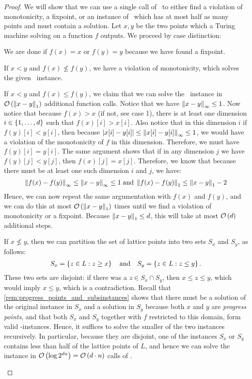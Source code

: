 \begin{proof}
	We will show that we can use a single call of \Tarskistar\ to either find a violation of monotonicity, a fixpoint, or an instance of \Tarski\, which has at most half as many points and must contain a solution. Let $x, y$ be the two points which a Turing machine solving \Tarskistar on a function $f$ outputs. We proceed by case distinction:
	\begin{case}{1}
		We are done if $f(x) = x$ or $f(y) = y$ because we have found a fixpoint.
	\end{case}
	\begin{case}{2.1}
		If $x < y$ and $f(x) \not\leq f(y)$, we have a violation of monotonicity, which solves the given \Tarski\ instance.
	\end{case}
	\begin{case}{2.2}
		If $x < y$ and $f(x) \leq f(y)$, we claim that we can solve the \Tarski\ instance in $\mathcal{O}\left(\left\lVert x - y\right\rVert_{1}\right)$ additional function calls. Notice that we have $\left\lVert x-y\right\rVert_{\infty} \leq 1$. Now notice that because $f(x) > x$ (if not, see case 1), there is at least one dimension $i \in \left\{1, \dots, d\right\}$ such that $f(x)[i] > x[i]$. Also notice that in this dimension $i$ if $f(y)[i] < y[i]$, then because $\left\lvert x[i] - y[i]\right\rvert \leq \left\lVert x[i] - y[i]\right\rVert_{\infty} \leq 1$, we would have a violation of the monotonicity of $f$ in this dimension. Therefore, we must have $f(y)[i] = y[i]$. The same argument shows that if in any dimension $j$ we have $f(y)[j] < y[j]$, then $f(x)[j] = x[j]$. Therefore, we know that because there must be at least one such dimension $i$ and $j$, we have:
		\begin{align*}
			\left\lVert f(x) - f(y)\right\rVert_{\infty} \leq \left\lVert x - y\right\rVert_{\infty} \leq 1 \; \text{and} \; \left\lVert f(x) - f(y)\right\rVert_{1} \leq \left\lVert x - y\right\rVert_{1} - 2
		\end{align*}
		Hence, we can now repeat the same argumentation with $f(x)$ and $f(y)$, and we can do this at most $\mathcal{O}\left(\left\lVert x - y\right\rVert_{1}\right)$ times until we find a violation of monotonicity or a fixpoint. Because $\left\lVert x - y\right\rVert_{1} \leq d$, this will take at most $\mathcal{O}\left(d\right)$ additional steps.
	\end{case}
	\begin{case}{3}
		If $x \not\leq y$, then we can partition the set of lattice points into two sets $S_x$ and $S_y$, as follows:
		\begin{align*}
			S_x = \left\{z \in L : z \geq x\right\} \quad \text{and} \quad S_y = \left\{z \in L : z \leq y\right\}.
		\end{align*}
		These two sets are disjoint: if there was a $z \in S_x \cap S_y$, then $x \leq z \leq y$, which would imply $x \leq y$, which is a contradiction. Recall that \cref{rem:progress_points_and_subsinstances} shows that there must be a solution of the original instance in $S_x$ and a solution in $S_y$ because both $x$ and $y$ are \emph{progress points}, and that both $S_x$ and $S_y$ together with $f$ restricted to this domain, form valid \Tarski-instances. Hence, it suffices to solve the smaller of the two instances recursively. In particular, because they are disjoint, one of the instances $S_x$ or $S_y$ contains less than half of the lattice points of $L$, and hence we can solve the instance in $\mathcal{O}\left(\log{2^{dn}}\right) = \mathcal{O}\left(d \cdot n\right)$ calls of \Tarskistar.

\end{case}
\end{proof}
